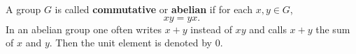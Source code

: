 A group $G$ is called \textbf{commutative} or \textbf{abelian} if for each $x, y \in G$,
$$xy = yx.$$
In an abelian group one often writes $x + y$ instead of $xy$ and calls $x + y$ the sum of $x$ and $y$. Then the unit element is denoted by $0$.
